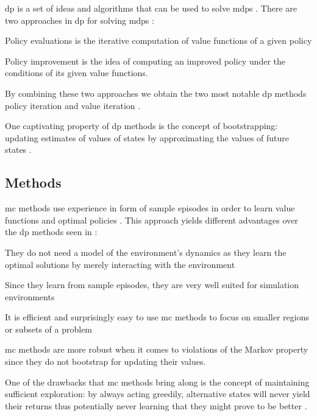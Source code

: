 \gls{dp} is a set of ideas and algorithms that can be used to solve \glspl{mdp} \citep[p. 95]{Sutton2017}. There are two approaches in \gls{dp} for solving \glspl{mdp} \citep[p. 95]{Sutton2017}:
\begin{enumerate*}
	\item Policy evaluations is the iterative computation of value functions of a given policy
	\item Policy improvement is the idea of computing an improved policy under the conditions of its given value functions.
\end{enumerate*}

By combining these two approaches we obtain the two most notable \gls{dp} methods \ie policy iteration and value iteration \citep[p. 95]{Sutton2017}.

One captivating property of \gls{dp} methods is the concept of bootstrapping: updating estimates of values of states by approximating the values of future states \citep[p. 96]{Sutton2017}.

\subsection{ Methods}
\label{subsec:mc}

\gls{mc} methods use experience in form of sample episodes in order to learn value functions and optimal policies \citep[p. 123]{Sutton2017}. This approach yields different advantages over the \gls{dp} methods seen in  \citep[p. 123]{Sutton2017}:
\begin{enumerate*}
	\item They do not need a model of the environment's dynamics as they learn the optimal solutions by merely interacting with the environment
	\item Since they learn from sample episodes, they are very well suited for simulation environments
	\item It is efficient and surprisingly easy to use \gls{mc} methods to focus on smaller regions or subsets of a problem
	\item \gls{mc} methods are more robust when it comes to violations of the Markov property since they do not bootstrap for updating their values.
\end{enumerate*}

One of the drawbacks that \gls{mc} methods bring along is the concept of maintaining sufficient exploration: by always acting greedily, alternative states will never yield their returns thus potentially never learning that they might prove to be better \citep[p. 123]{Sutton2017}.

